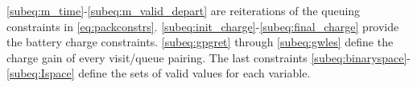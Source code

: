 \autoref{subeq:m_time}-\autoref{subeq:m_valid_depart} are reiterations of the queuing constraints in
\autoref{eq:packconstrs}. \autoref{subeq:init_charge}-\autoref{subeq:final_charge} provide the battery charge
constraints. \autoref{subeq:gpgret} through \autoref{subeq:gwles} define the charge gain of every visit/queue
pairing. The last constraints \autoref{subeq:binaryspace}-\autoref{subeq:Ispace} define the sets of valid values for each
variable.
